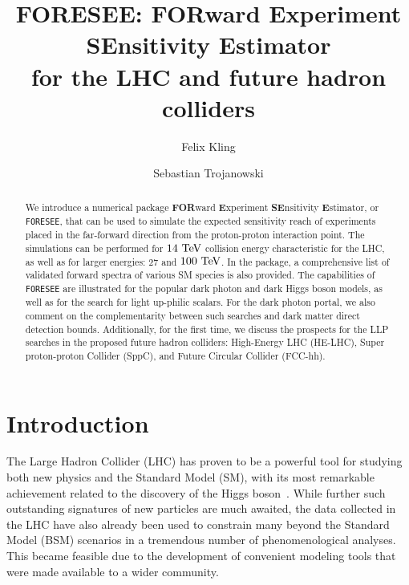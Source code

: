 \documentclass[prd,twocolumn,reprint,preprintnumbers,nofootinbib]{revtex4-1}
\begin{document}
\title{FORESEE: FORward Experiment SEnsitivity Estimator\\ for the LHC and future hadron colliders}

\author{Felix Kling}

\author{Sebastian Trojanowski}

\begin{abstract}
We introduce a numerical package \textbf{FOR}ward \textbf{E}xperiment \textbf{SE}nsitivity \textbf{E}stimator, or \texttt{FORESEE}, that can be used to simulate the expected sensitivity reach of experiments placed in the far-forward direction from the proton-proton interaction point. The simulations can be performed for $14~\text{TeV}$ collision energy characteristic for the LHC, as well as for larger energies: $27$ and $100~\text{TeV}$. In the package, a comprehensive list of validated forward spectra of various SM species is also provided. The capabilities of \texttt{FORESEE} are illustrated for the popular dark photon and dark Higgs boson models, as well as for the search for light up-philic scalars. For the dark photon portal, we also comment on the complementarity between such searches and dark matter direct detection bounds. Additionally, for the first time, we discuss the prospects for the LLP searches in the proposed future hadron colliders: High-Energy LHC (HE-LHC), Super proton-proton Collider (SppC), and Future Circular Collider (FCC-hh).
\end{abstract}

\maketitle

\section{Introduction}
\label{sec:intro}

The Large Hadron Collider (LHC) has proven to be a powerful tool for studying both new physics and the Standard Model (SM), with its most remarkable achievement related to the discovery of the Higgs boson~\cite{Chatrchyan:2012ufa,Aad:2012tfa}. While further such outstanding signatures of new particles are much awaited, the data collected in the LHC have also already been used to constrain many beyond the Standard Model (BSM) scenarios in a tremendous number of phenomenological analyses. This became feasible due to the development of convenient modeling tools that were made available to a wider community. 
\end{document}

